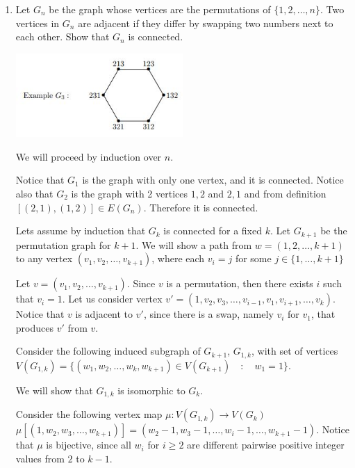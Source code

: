 \begin{enumerate}
        \item Let $G_n$ be the graph whose vertices are the permutations of $\{1,2,\ldots, n \}$. Two vertices in $G_n$ are adjacent if they differ by swapping two numbers next to each other. Show that $G_n$ is connected.
        
        \includegraphics[width=0.5\textwidth]{perm.JPG}
        
        \vspace{3em}
        
        We will proceed by induction over $n$.
        
        Notice that $G_1$ is the graph with only one vertex, and it is connected. Notice also that $G_2$ is the graph with 2 vertices $1,2$ and $2,1$ and from definition $[(2,1), (1,2)] \in E(G_n)$. Therefore it is connected.
        
        Lets assume by induction that $G_k$ is connected for a fixed $k$. Let $G_{k+1}$ be the permutation graph for $k+1$. We will show a path from $w=(1,2,\ldots,k+1)$ to any vertex $(v_1,v_2, \ldots,v_{k+1})$, where each $v_i = j$ for some $j \in \{1,\ldots ,k+1\}$
        
        Let $v=(v_1,v_2, \ldots,v_{k+1})$. Since $v$ is a permutation, then there exists $i$ such that $v_i = 1$. Let us consider vertex $v'= (1, v_2,v_3, \ldots, v_{i-1},v_1,v_{i+1}, \ldots, v_k)$. Notice that $v$ is adjacent to $v'$, since there is a swap, namely $v_i$ for $v_1$, that produces $v'$ from $v$.
        
        Consider the following induced subgraph of $G_{k+1}$, $G_{1,k}$, with set of vertices $V(G_{1,k})= \{ (w_1,w_2, \ldots,w_k, w_{k+1}) \in V(G_{k+1}) \quad : \quad w_1 = 1 \}$.
        
        We will show that $G_{1,k}$ is isomorphic to $G_k$.
        
        Consider the following vertex map $\mu: V(G_{1,k}) \rightarrow V(G_k)$
        $\mu[ (1,w_2, w_3, \ldots, w_{k+1}) ] = (w_2-1, w_3-1, \ldots, w_i -1, \ldots, w_{k+1}-1)$. Notice that $\mu $ is bijective, since all $w_i$ for $i \geq 2$ are different pairwise positive integer values from $2$ to $k-1$.
        

\end{enumerate}
